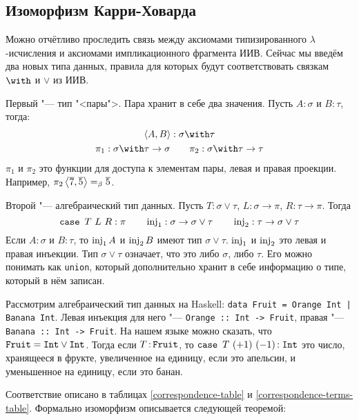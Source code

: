 \subsection{\texorpdfstring{Изоморфизм Карри-Ховарда}{Curry-Howard correspondence}}

Можно отчётливо проследить связь между аксиомами типизированного $\lambda$-исчисления и аксиомами импликационного фрагмента ИИВ.
Сейчас мы введём два новых типа данных, правила для которых будут соответствовать связкам $\with$ и $\lor$ из ИИВ.

Первый "--- тип "<пары">. Пара хранит в себе два значения. Пусть $A : \sigma$ и $B : \tau$, тогда:
\begin{gather*}
    \pair{A,B} : \sigma \with \tau \\
    \pi_1 : \sigma\with\tau\to\sigma \qquad \pi_2 : \sigma\with\tau\to\tau
\end{gather*}
$\pi_1$ и $\pi_2$ это функции для доступа к элементам пары, левая и правая проекции.
Например, $\pi_2 \left<\overline 7,\overline 5\right> =_\beta \overline 5$.

Второй "--- алгебраический тип данных. Пусть $T : \sigma\vee\tau$, $L : \sigma\to\pi$, $R : \tau\to\pi$. Тогда
\[
    \mathinner{\mathtt{case}}~T~L~R : \pi \qquad \operatorname{inj}_1 : \sigma\to\sigma\vee\tau \qquad \operatorname{inj}_2 : \tau\to\sigma\vee\tau
\]
Если $A : \sigma$ и $B : \tau$, то $\operatorname{inj}_1 A$ и $\operatorname{inj}_2 B$ имеют тип $\sigma\vee\tau$.
$\operatorname{inj}_1$ и $\operatorname{inj}_2$ это левая и правая инъекции.
Тип $\sigma \vee \tau$ означает, что это либо $\sigma$, либо $\tau$.
Его можно понимать как \texttt{union}, который дополнительно хранит в себе информацию о типе, который в нём записан.

Рассмотрим алгебраический тип данных на Haskell: \texttt{data Fruit = Orange Int | Banana Int}. Левая инъекция для него "---
\texttt{Orange :: Int -> Fruit}, правая "--- \texttt{Banana :: Int -> Fruit}.
На нашем языке можно сказать, что $\mathinner\mathtt{Fruit} = \mathinner{\mathtt{Int}} \vee \mathinner{\mathtt{Int}}$.
Тогда если $T \mathinner{:} \mathtt{Fruit}$, то $\mathinner{\mathtt{case}}~T~(+1)~(-1) \mathinner{:} \mathrel{\mathtt{Int}}$ это число,
хранящееся в фрукте, увеличенное на единицу, если это апельсин, и уменьшенное на единицу, если это банан.

Соответствие описано в таблицах \ref{correspondence-table} и \ref{correspondence-terms-table}.
Формально изоморфизм описывается следующей теоремой:

